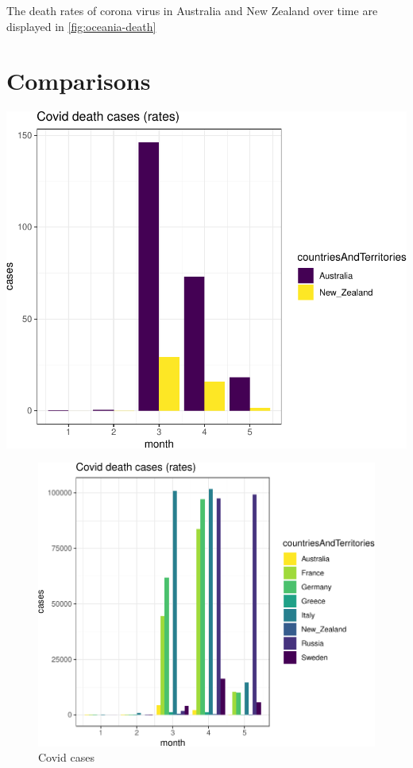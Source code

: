\documentclass[11pt,a4paper,]{article}
\begin{document}
The death rates of corona virus in Australia and New Zealand over time are displayed in \ref{fig:oceania-death}

\clearpage

\hypertarget{comparisons}{%
\section{Comparisons}\label{comparisons}}

\begin{center}\includegraphics{Example_files/figure-latex/unnamed-chunk-3-1} \end{center}

\begin{figure}

{\centering \includegraphics{Example_files/figure-latex/unnamed-chunk-4-1} 

}

\caption{Covid cases}\label{fig:unnamed-chunk-4}
\end{figure}
\end{document}
